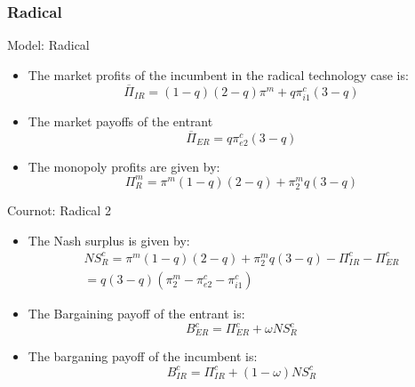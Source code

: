 \documentclass{beamer}
\numberwithin{equation}{section}
\begin{document}
\subsubsection{Radical}

\begin{frame}{Model: Radical}
\begin{itemize}
    \item The market profits of the incumbent in the radical  technology case is:
    \begin{equation*}
       \overline{\Pi}_{IR} = (1-q) (2-q)\pi^{m}  + q \pi_{i1}^{c}(3-q)
    \end{equation*}
    \item The market payoffs of the entrant 
    \begin{equation*}
\overline{\Pi}_{ER} =
q \pi_{e2}^{c} (3-q)
    \end{equation*}
    \item The monopoly profits are given by:
\begin{equation*}
\Pi_{R}^{m} = \pi^{m} (1-q) (2-q)+\pi_{2}^{m} q (3-q)
\end{equation*}
\end{itemize}
\end{frame}

\begin{frame}{Cournot: Radical 2}
\begin{itemize}
\item The Nash surplus is given by:
\begin{align*}
NS_{R}^{c} = \pi^{m} (1-q) (2-q)+\pi_{2}^{m} q (3-q)- \Pi_{IR}^{c} - \Pi_{ER}^{c} \\
= q(3-q) (\pi_{2}^{m}-\pi_{e2}^{c}-\pi_{i1}^{c})
\end{align*}



\item The Bargaining payoff of the entrant is: 
\begin{equation*}
B_{ER}^{c} = \Pi_{ER}^{c} + \omega NS_{R}^{c} 
\end{equation*}
    
\item The barganing payoff of the incumbent is: \begin{equation*}
B_{IR}^{c} = \Pi_{IR}^{c} + (1-\omega) NS_{R}^{c}
\end{equation*}
\end{itemize}
\end{frame}
\end{document}
